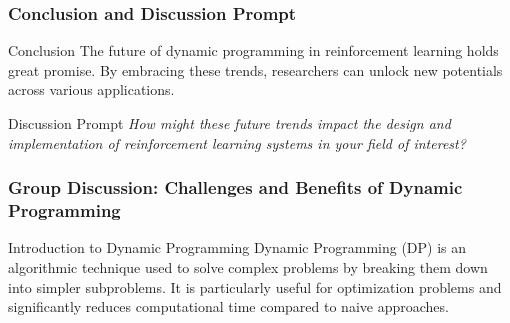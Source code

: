 \documentclass[aspectratio=169]{beamer}
\begin{document}
\begin{frame}[fragile]
    \frametitle{Conclusion and Discussion Prompt}
    \begin{block}{Conclusion}
        The future of dynamic programming in reinforcement learning holds great promise. By embracing these trends, researchers can unlock new potentials across various applications.
    \end{block}
    
    \begin{block}{Discussion Prompt}
        \textit{How might these future trends impact the design and implementation of reinforcement learning systems in your field of interest?}
    \end{block}
\end{frame}

\begin{frame}[fragile]
    \frametitle{Group Discussion: Challenges and Benefits of Dynamic Programming}
    \begin{block}{Introduction to Dynamic Programming}
        Dynamic Programming (DP) is an algorithmic technique used to solve complex problems by breaking them down into simpler subproblems. It is particularly useful for optimization problems and significantly reduces computational time compared to naive approaches.
    \end{block}
\end{frame}
\end{document}
